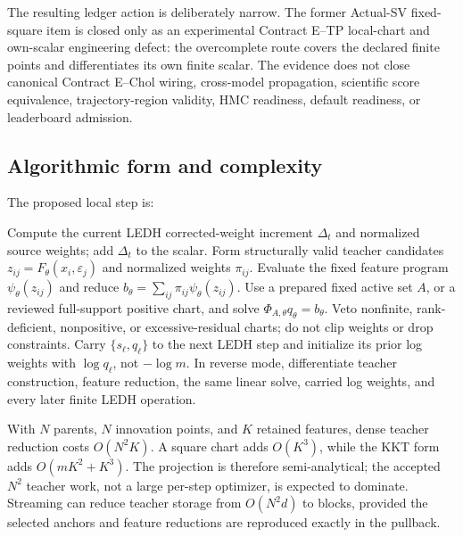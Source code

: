 The resulting ledger action is deliberately narrow.  The former Actual-SV
fixed-square item is closed only as an experimental Contract E--TP local-chart
and own-scalar engineering defect: the overcomplete route covers the declared
finite points and differentiates its own finite scalar.  The evidence does not
close canonical Contract E--Chol wiring, cross-model propagation, scientific
score equivalence, trajectory-region validity, HMC readiness, default
readiness, or leaderboard admission.

\subsection{Algorithmic form and complexity}

The proposed local step is:
\begin{algorithm}[H]
\caption{Proposed Contract E--TP local score-aware reset}
\label{alg:bf-ledh-score-aware-teacher-projection}
\begin{algorithmic}[1]
  \State Compute the current LEDH corrected-weight increment \(\Delta_t\) and
    normalized source weights; add \(\Delta_t\) to the scalar.
  \State Form structurally valid teacher candidates
    \(z_{ij}=F_\theta(x_i,\varepsilon_j)\) and normalized weights \(\pi_{ij}\).
  \State Evaluate the fixed feature program \(\psi_\theta(z_{ij})\) and reduce
    \(b_\theta=\sum_{ij}\pi_{ij}\psi_\theta(z_{ij})\).
  \State Use a prepared fixed active set \(A\), or a reviewed full-support
    positive chart, and solve \(\Phi_{A,\theta}q_\theta=b_\theta\).
  \State Veto nonfinite, rank-deficient, nonpositive, or excessive-residual
    charts; do not clip weights or drop constraints.
  \State Carry \(\{s_\ell,q_\ell\}\) to the next LEDH step and initialize its
    prior log weights with \(\log q_\ell\), not \(-\log m\).
  \State In reverse mode, differentiate teacher construction, feature
    reduction, the same linear solve, carried log weights, and every later
    finite LEDH operation.
\end{algorithmic}
\end{algorithm}

With \(N\) parents, \(N\) innovation points, and \(K\) retained features, dense
teacher reduction costs \(O(N^2K)\).  A square chart adds \(O(K^3)\), while the
KKT form adds \(O(mK^2+K^3)\).  The projection is therefore semi-analytical;
the accepted \(N^2\) teacher work, not a large per-step optimizer, is expected
to dominate.  Streaming can reduce teacher storage from \(O(N^2d)\) to blocks,
provided the selected anchors and feature reductions are reproduced exactly in
the pullback.

